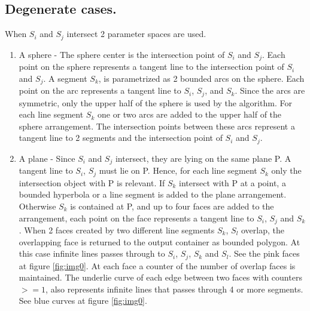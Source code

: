 \subsection{Degenerate cases.}
When $S_i$ and $S_j$ intersect 2 parameter spaces are used.
\begin{enumerate}
\item A sphere - The sphere center is the intersection point of $S_i$ and $S_j$. Each point on the sphere represents a tangent line to the intersection point of $S_i$ and $S_j$. A segment $S_k$, is parametrized as 2 bounded arcs on the sphere. Each point on the arc represents a tangent line to $S_i$, $S_j$, and $S_k$.  Since the arcs are symmetric, only the upper half of the sphere is used by the algorithm.\newline
For each line segment $S_k$ one or two arcs are added to the upper half of the sphere arrangement. The intersection points between these arcs represent a tangent line to 2 segments and the intersection point of $S_i$ and $S_j$.
\item
A plane - Since $S_i$ and $S_j$ intersect, they are lying on the same plane P. A tangent line to $S_i$, $S_j$ must lie on P. Hence, for each line segment $S_k$ only the intersection object with P is relevant.
If $S_k$ intersect with P at a point, a bounded hyperbola or a line segment is added to the plane arrangement. Otherwise $S_k$ is contained at P, and up to four faces are added to the arrangement, each point on the face represents a tangent line to $S_i$, $S_j$ and $S_k$.
When 2 faces created by two different line segments $S_k$, $S_l$ overlap, the overlapping face is returned to the output container as bounded polygon. At this case infinite lines passes through to $S_i$, $S_j$, $S_k$ and $S_l$. See the pink faces at figure \ref{fig:img0}.
At each face a counter of the number of overlap faces is maintained. The underlie curve of each edge between two faces with counters $>= 1$, also represents infinite lines that passes through 4 or more segments. See blue curves at figure \ref{fig:img0}.
\end{enumerate}

